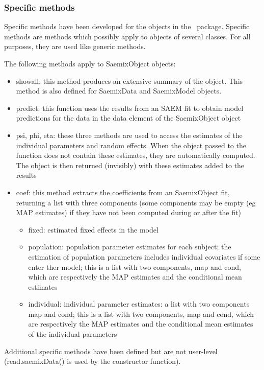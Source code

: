 \subsubsection{Specific methods}

Specific methods have been developed for the objects in the \saemix~package. Specific methods are methods which possibly apply to objects of several classes. For all purposes, they are used like generic methods.

The following methods apply to {\sf SaemixObject} objects:
\begin{itemize}
\item showall: this method produces an extensive summary of the object. This method is also defined for {\sf SaemixData} and {\sf SaemixModel} objects.
\item predict: this function uses the results from an SAEM fit to obtain model predictions for the data in the {\sf data} element of the {\sf SaemixObject} object
\item psi, phi, eta: these three methods are used to access the estimates of the individual parameters and random effects.  When the object passed to the function does not contain these estimates, they are automatically computed. The object is then returned (invisibly) with these estimates added to the results
\item coef: this method extracts the coefficients from an {\sf SaemixObject} fit, returning a list with three components (some components may be empty (eg MAP estimates) if they have not been computed during or after the fit)
   \begin{itemize}
   \item fixed: estimated fixed effects in the model
   \item population: population parameter estimates for each subject; the estimation of population parameters includes individual covariates if some enter ther model; this is a list with two components, map and cond, which are respectively the MAP estimates and the conditional mean estimates
   \item individual: individual parameter estimates: a list with two components map and cond; this is a list with two components, map and cond, which are respectively the MAP estimates and the conditional mean estimates of the individual parameters
   \end{itemize}
\end{itemize}

Additional specific methods have been defined but are not user-level ({\sf read.saemixData()} is used by the constructor function).

